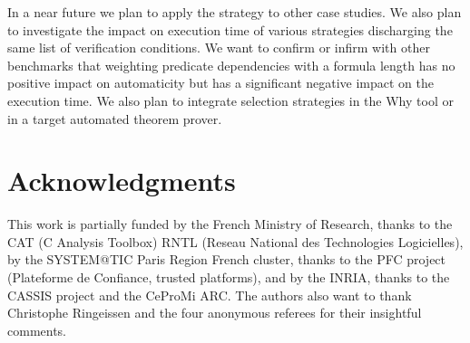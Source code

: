 \documentclass{acm_proc_article-sp}
\theoremstyle{nonumberplain}
\begin{document}
In a near future we plan to apply the strategy to other case studies.
We also plan to investigate the impact on execution time of various
strategies discharging the same list of verification conditions. We
want to confirm or infirm with other benchmarks that weighting
predicate dependencies with a formula length has no positive impact on
automaticity but has a significant negative impact on the execution
time. We also plan to integrate selection strategies in the Why tool or
in a target automated theorem prover.


\section{Acknowledgments}
This work is partially funded by the French Ministry of Research,
thanks to the CAT (C Analysis Toolbox) RNTL (Reseau National des
Technologies Logicielles), by the SYSTEM@TIC Paris Region French
cluster, thanks to the PFC project (Plateforme de Confiance, trusted
platforms), and by the INRIA, thanks to the CASSIS project and the
CeProMi ARC. The authors also want to thank Christophe Ringeissen and
the four anonymous referees for their insightful comments.
\end{document}
